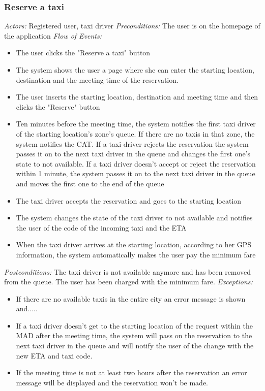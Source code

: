 \documentclass{article}
\begin{document}
	\subsubsection{Reserve a taxi}
	\textit{Actors:} Registered user, taxi driver
	\textit{Preconditions:} The user is on the homepage of the application %
	\textit{Flow of Events:}
	\begin{itemize}
		\item  The user clicks the "Reserve a taxi" button
		\item  The system shows the user a page where she can enter the starting location, destination and the meeting time of the reservation.
		\item  The user inserts the starting location, destination and meeting time and then clicks the "Reserve" button
		\item  Ten minutes before the meeting time, the system notifies the first taxi driver of the starting location's zone's queue. If there are no taxis in that zone, the system notifies the CAT. If a taxi driver rejects the reservation the system passes it on to the next taxi driver in the queue and changes the first one's state to not available. If a taxi driver doesn't accept or reject the reservation within 1 minute, the system passes it on to the next taxi driver in the queue and moves the first one to the end of the queue
		\item  The taxi driver accepts the reservation and goes to the starting location
		\item  The system changes the state of the taxi driver to not available and notifies the user of the code of the incoming taxi and the ETA
		\item  When the taxi driver arrives at the starting location, according to her GPS information, the system automatically makes the user pay the minimum fare
	\end{itemize}
	\textit{Postconditions:} The taxi driver is not available anymore and has been removed from the queue. The user has been charged with the minimum fare. %
	\textit{Exceptions:}
	\begin{itemize}
		\item If there are no available taxis in the entire city an error message is shown and..... %
		\item If a taxi driver doesn't get to the starting location of the request within the MAD after the meeting time, the system will pass on the reservation to the next taxi driver in the queue and will notify the user of the change with the new ETA and taxi code.
		\item If the meeting time is not at least two hours after the reservation an error message will be displayed and the reservation won't be made.
	\end{itemize}
\end{document}
